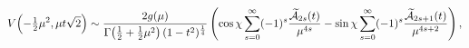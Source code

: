 \[\mathop{V\/}\nolimits\!\left(-\tfrac{1}{2}\mu^{2},\mu t\sqrt{2}\right)\sim%
\frac{2g(\mu)}{\mathop{\Gamma\/}\nolimits\!\left(\tfrac{1}{2}+\tfrac{1}{2}\mu^%
{2}\right)(1-t^{2})^{\frac{1}{4}}}\*\left(\mathop{\cos\/}\nolimits\chi\sum_{s=%
0}^{\infty}(-1)^{s}\frac{\widetilde{\cal{A}}_{2s}(t)}{\mu^{4s}}-\mathop{\sin\/%
}\nolimits\chi\sum_{s=0}^{\infty}(-1)^{s}\frac{\widetilde{\cal{A}}_{2s+1}(t)}{%
\mu^{4s+2}}\right),\]